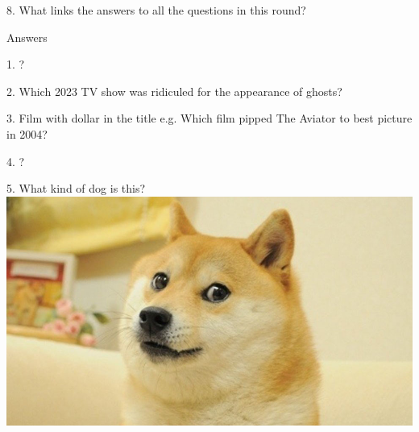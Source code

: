 \begin{frame}
\begin{center}
\Large
8. What links the answers to all the questions in this round?
\end{center}
\end{frame}
\begin{frame}
\begin{center}
\Huge
Answers
\end{center}
\end{frame}
\begin{frame}
\begin{center}
\Large
1. ?
\\
\end{center}
\end{frame}
\begin{frame}
\begin{center}
\Large
2. Which 2023 TV show was ridiculed for the appearance of ghosts?
\\
\end{center}
\end{frame}
\begin{frame}
\begin{center}
\Large
3. Film with dollar in the title e.g. Which film pipped The Aviator to best picture in 2004?
\\
\end{center}
\end{frame}
\begin{frame}
\begin{center}
\Large
4. ?
\\
\end{center}
\end{frame}
\begin{frame}
\begin{center}
\Large
5. What kind of dog is this?
\\
\vspace{0.5em}\includegraphics[height=0.6\paperheight]{images/doge.jpg}
\\
\end{center}
\end{frame}
